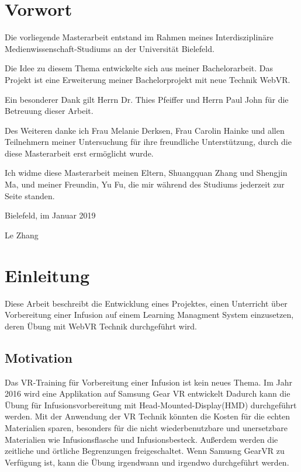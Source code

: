 \chapter*{Vorwort}

Die vorliegende Masterarbeit entstand im Rahmen meines Interdisziplinäre Medienwissenschaft-Studiums an der Universität Bielefeld.
 
Die Idee zu diesem Thema entwickelte sich aus meiner Bachelorarbeit. Das Projekt ist eine Erweiterung meiner Bachelorprojekt mit neue Technik WebVR.
 
Ein besonderer Dank gilt Herrn Dr. Thies Pfeiffer und Herrn Paul John für die Betreuung dieser Arbeit.
 
Des Weiteren danke ich Frau Melanie Derksen, Frau Carolin Hainke und allen Teilnehmern meiner Untersuchung für ihre freundliche Unterstützung, durch die diese Masterarbeit erst ermöglicht wurde.
 
Ich widme diese Masterarbeit meinen Eltern, Shuangquan Zhang und Shengjin Ma, und meiner Freundin, Yu Fu, die mir während des Studiums jederzeit zur Seite standen.

\vspace{5mm}
 
Bielefeld, im Januar 2019
 
Le Zhang

\chapter{Einleitung}

Diese Arbeit beschreibt die Entwicklung eines Projektes, einen Unterricht über Vorbereitung einer Infusion auf einem Learning Managment System einzusetzen, deren Übung mit WebVR Technik durchgeführt wird.

\section{Motivation}

Das VR-Training für Vorbereitung einer Infusion ist kein neues Thema. Im Jahr 2016 wird eine Applikation auf Samsung Gear VR entwickelt\citep{26}
Dadurch kann die Übung für Infusionsvorbereitung mit Head-Mounted-Display(HMD) durchgeführt werden. Mit der Anwendung der VR Technik könnten die Kosten für die echten Materialien sparen, besonders für die nicht wiederbenutzbare und unersetzbare Materialien wie Infusionsflasche und Infusionsbesteck. Außerdem werden die zeitliche und örtliche Begrenzungen freigeschaltet. Wenn Samusng GearVR zu Verfügung ist, kann die Übung irgendwann und irgendwo durchgeführt werden.

